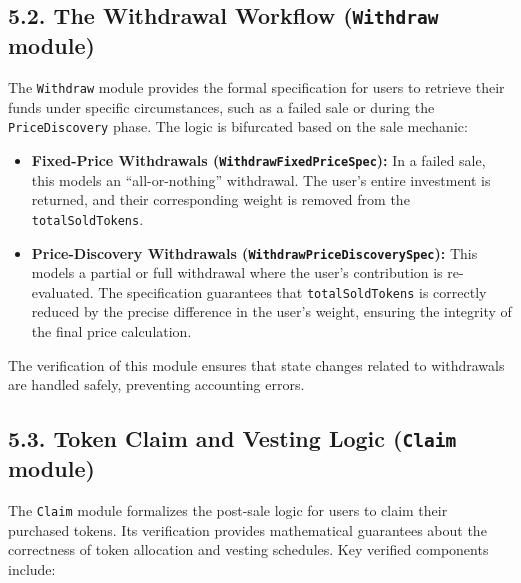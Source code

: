 \documentclass[
  english,
  onecolumn]{article}
\providecommand{\tightlist}{%
  \setlength{\itemsep}{0pt}\setlength{\parskip}{0pt}}
\begin{document}
\subsection{\texorpdfstring{5.2. The Withdrawal Workflow
(\texttt{Withdraw}
module)}{5.2. The Withdrawal Workflow (Withdraw module)}}\label{the-withdrawal-workflow-withdraw-module}

The \texttt{Withdraw} module provides the formal specification for users
to retrieve their funds under specific circumstances, such as a failed
sale or during the \texttt{PriceDiscovery} phase. The logic is
bifurcated based on the sale mechanic:

\begin{itemize}
\tightlist
\item
  \textbf{Fixed-Price Withdrawals (\texttt{WithdrawFixedPriceSpec}):} In
  a failed sale, this models an ``all-or-nothing'' withdrawal. The
  user's entire investment is returned, and their corresponding weight
  is removed from the \texttt{totalSoldTokens}.
\item
  \textbf{Price-Discovery Withdrawals
  (\texttt{WithdrawPriceDiscoverySpec}):} This models a partial or full
  withdrawal where the user's contribution is re-evaluated. The
  specification guarantees that \texttt{totalSoldTokens} is correctly
  reduced by the precise difference in the user's weight, ensuring the
  integrity of the final price calculation.
\end{itemize}

The verification of this module ensures that state changes related to
withdrawals are handled safely, preventing accounting errors.

\subsection{\texorpdfstring{5.3. Token Claim and Vesting Logic
(\texttt{Claim}
module)}{5.3. Token Claim and Vesting Logic (Claim module)}}\label{token-claim-and-vesting-logic-claim-module}

The \texttt{Claim} module formalizes the post-sale logic for users to
claim their purchased tokens. Its verification provides mathematical
guarantees about the correctness of token allocation and vesting
schedules. Key verified components include:
\end{document}
